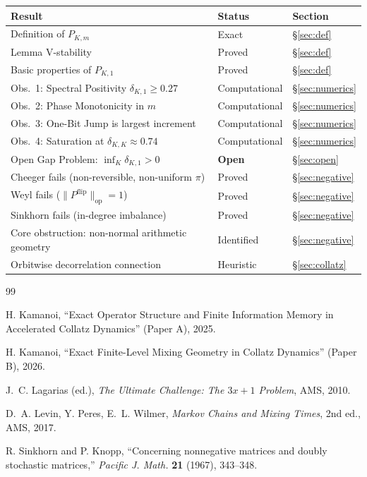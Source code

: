 \documentclass[12pt]{article}
\theoremstyle{definition}
\newcommand{\Pkm}{P_{K,m}}
\newcommand{\PKone}{P_{K,1}}
\begin{document}
\begin{center}
\begin{tabular}{@{}lll@{}}
\toprule
Result & Status & Section \\
\midrule
Definition of $\Pkm$ & Exact & \S\ref{sec:def} \\
Lemma V-stability & Proved & \S\ref{sec:def} \\
Basic properties of $\PKone$ & Proved & \S\ref{sec:def} \\
Obs.\ 1: Spectral Positivity $\delta_{K,1} \geq 0.27$ & Computational & \S\ref{sec:numerics} \\
Obs.\ 2: Phase Monotonicity in $m$ & Computational & \S\ref{sec:numerics} \\
Obs.\ 3: One-Bit Jump is largest increment & Computational & \S\ref{sec:numerics} \\
Obs.\ 4: Saturation at $\delta_{K,K} \approx 0.74$ & Computational & \S\ref{sec:numerics} \\
Open Gap Problem: $\inf_K \delta_{K,1} > 0$ & \textbf{Open} & \S\ref{sec:open} \\
Cheeger fails (non-reversible, non-uniform $\pi$) & Proved & \S\ref{sec:negative} \\
Weyl fails ($\|P^{\mathrm{flip}}\|_{\mathrm{op}} = 1$) & Proved & \S\ref{sec:negative} \\
Sinkhorn fails (in-degree imbalance) & Proved & \S\ref{sec:negative} \\
Core obstruction: non-normal arithmetic geometry & Identified & \S\ref{sec:negative} \\
Orbitwise decorrelation connection & Heuristic & \S\ref{sec:collatz} \\
\bottomrule
\end{tabular}
\end{center}

\begin{thebibliography}{99}

H. Kamanoi,
``Exact Operator Structure and Finite Information Memory in Accelerated Collatz Dynamics''
(Paper A), 2025.

H. Kamanoi,
``Exact Finite-Level Mixing Geometry in Collatz Dynamics''
(Paper B), 2026.

J.~C. Lagarias (ed.),
\textit{The Ultimate Challenge: The $3x+1$ Problem},
AMS, 2010.

D.~A. Levin, Y. Peres, E.~L. Wilmer,
\textit{Markov Chains and Mixing Times}, 2nd ed., AMS, 2017.

R. Sinkhorn and P. Knopp,
``Concerning nonnegative matrices and doubly stochastic matrices,''
\textit{Pacific J. Math.} \textbf{21} (1967), 343--348.

\end{thebibliography}
\end{document}
